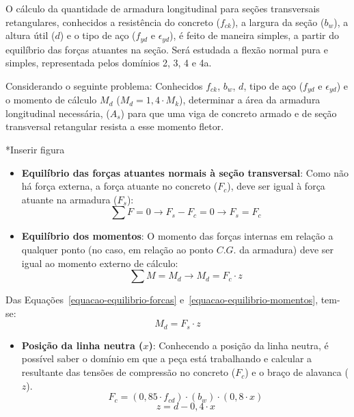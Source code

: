 O cálculo da quantidade de armadura longitudinal para seções transversais retangulares, conhecidos a resistência do concreto ($f_{ck}$), a largura da seção ($b_w$), a altura útil ($d$) e o tipo de aço ($f_{yd}$ e $\epsilon_{yd}$), é feito de maneira simples, a partir do equilíbrio das forças atuantes na seção. Será estudada a flexão normal pura e simples, representada pelos domínios 2, 3, 4 e 4a.

Considerando o seguinte problema: Conhecidos $f_{ck}$, $b_w$, $d$, tipo de aço ($f_{yd}$ e $\epsilon_{yd}$) e o momento de cálculo $M_d$ ($M_d=1,4\cdot M_k$), determinar a área da armadura longitudinal necessária, ($A_s$) para que uma viga de concreto armado e de seção transversal retangular resista a esse momento fletor.

*Inserir figura
\begin{itemize}
	\item \textbf{Equilíbrio das forças atuantes normais à seção transversal}: Como não há força externa, a força atuante no concreto ($F_c$), deve ser igual à força atuante na armadura ($F_s$):
		\begin{equation}
			\label{equacao-equilibrio-forcas}
			\sum F=0\rightarrow F_s-F_c=0\rightarrow F_s=F_c
		\end{equation}

	\item \textbf{Equilíbrio dos momentos}: O momento das forças internas em relação a qualquer ponto (no caso, em relação ao ponto $C.G.$ da armadura) deve ser igual ao momento externo de cálculo:
		\begin{equation}
			\label{equacao-equilibrio-momentos}
			\sum M=M_d\rightarrow M_d=F_c\cdot z
		\end{equation}
\end{itemize}

Das Equações~\eqref{equacao-equilibrio-forcas} e~\eqref{equacao-equilibrio-momentos}, tem-se:
\begin{equation}
	\label{equacao-momento-de-calculo1}
	M_d=F_s\cdot z
\end{equation}

\begin{itemize}
	\item \textbf{Posição da linha neutra ($x$)}: Conhecendo a posição da linha neutra, é possível saber o domínio em que a peça está trabalhando e calcular a resultante das tensões de compressão no concreto ($F_c$) e o braço de alavanca ($z$).
		\begin{equation}
			\label{equacao-resultante-fc}
			F_c=(0,85\cdot f_{cd})\cdot(b_w)\cdot(0,8\cdot x)
		\end{equation}
		\begin{equation}
			\label{equacao-z}
			z=d-0,4\cdot x
		\end{equation}
\end{itemize}

